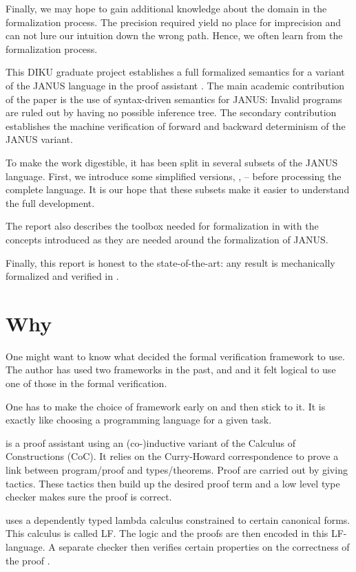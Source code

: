 Finally, we may hope to gain additional knowledge about the domain in
the formalization process. The precision required yield no place for
imprecision and can not lure our intuition down the wrong path. Hence,
we often learn from the formalization process.

This DIKU graduate project establishes a full formalized semantics for
a variant of the JANUS language in the proof assistant \coq{}. The
main academic contribution of the paper is the use of syntax-driven
semantics for JANUS: Invalid programs are ruled out by having no possible
inference tree. The secondary contribution establishes the machine
verification of forward and backward determinism of the JANUS variant.

To make the work digestible, it has been split in several subsets of
the JANUS language. First, we introduce some simplified versions,
\janusz{}, \januso{} -- before processing the complete language. It is
our hope that these subsets make it easier to understand the full
development.

The report also describes the toolbox needed for formalization in
\coq{} with the concepts introduced as they are needed around the
formalization of JANUS.

Finally, this report is honest to the state-of-the-art: any result is
mechanically formalized and verified in \coq{}.

\section{Why \coq{}}

One might want to know what decided the formal verification framework
to use. The author has used two frameworks in the past, \coq{} and \twelf{}
and it felt logical to use one of those in the formal verification.

One has to make the choice of framework early on and then stick to
it. It is exactly like choosing a programming language for a given
task.

\coq{} is a proof assistant using an (co-)inductive variant of the
Calculus of Constructions (CoC). It relies on the Curry-Howard
correspondence to prove a link between program/proof and
types/theorems. Proof are carried out by giving tactics. These tactics
then build up the desired proof term and a low level type checker
makes sure the proof is correct.

\twelf{} uses a dependently typed lambda calculus constrained to certain
canonical forms. This calculus is called LF. The logic and the proofs
are then encoded in this LF-language. A separate checker then verifies
certain properties on the correctness of the proof
\cite{harper+05:how-to-believe, harper+07:mechanizing}.


